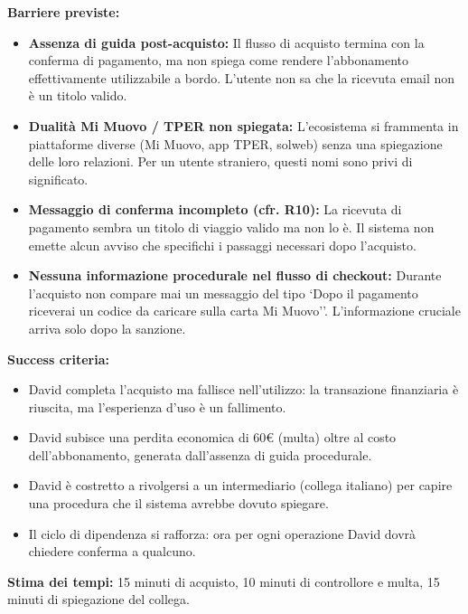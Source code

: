 \documentclass[11pt,a4paper]{article}
\begin{document}
\begin{tcolorbox}[colback=backgroundColor,colframe=borderColor,arc=2mm]
{    \textbf{Barriere previste:}
    \begin{itemize}
        \item \textbf{Assenza di guida post-acquisto:} Il flusso di acquisto termina con la conferma di pagamento, ma non spiega come rendere l'abbonamento effettivamente utilizzabile a bordo. L'utente non sa che la ricevuta email non è un titolo valido.
        \item \textbf{Dualità Mi Muovo / TPER non spiegata:} L'ecosistema si frammenta in piattaforme diverse (Mi Muovo, app TPER, solweb) senza una spiegazione delle loro relazioni. Per un utente straniero, questi nomi sono privi di significato.
        \item \textbf{Messaggio di conferma incompleto (cfr. R10):} La ricevuta di pagamento sembra un titolo di viaggio valido ma non lo è. Il sistema non emette alcun avviso che specifichi i passaggi necessari dopo l'acquisto.
        \item \textbf{Nessuna informazione procedurale nel flusso di checkout:} Durante l'acquisto non compare mai un messaggio del tipo `Dopo il pagamento riceverai un codice da caricare sulla carta Mi Muovo''. L'informazione cruciale arriva solo dopo la sanzione.
    \end{itemize}

    \textbf{Success criteria:}
    \begin{itemize}
        \item David completa l'acquisto ma fallisce nell'utilizzo: la transazione finanziaria è riuscita, ma l'esperienza d'uso è un fallimento.
        \item David subisce una perdita economica di 60\euro{} (multa) oltre al costo dell'abbonamento, generata dall'assenza di guida procedurale.
        \item David è costretto a rivolgersi a un intermediario (collega italiano) per capire una procedura che il sistema avrebbe dovuto spiegare.
        \item Il ciclo di dipendenza si rafforza: ora per ogni operazione David dovrà chiedere conferma a qualcuno.
    \end{itemize}

    \textbf{Stima dei tempi:} 15 minuti di acquisto, 10 minuti di controllore e multa, 15 minuti di spiegazione del collega.
    }
\end{tcolorbox}

\newpage

\end{document}
